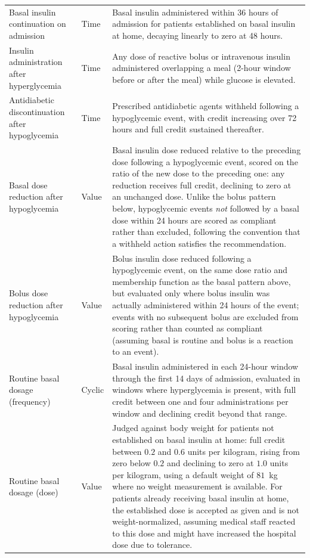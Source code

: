 \begin{table}[htbp]
\begin{tabularx}{\textwidth}{
>{\raggedright\arraybackslash}p{}
l
>{\raggedright\arraybackslash}X
}
Basal insulin continuation on admission & Time &
Basal insulin administered within 36 hours of admission for patients
established on basal insulin at home, decaying linearly to zero at 48
hours. \\

Insulin administration after hyperglycemia & Time &
Any dose of reactive bolus or intravenous insulin administered overlapping a
meal (2-hour window before or after the meal) while glucose is elevated. \\

Antidiabetic discontinuation after hypoglycemia & Time &
Prescribed antidiabetic agents withheld following a hypoglycemic event, with
credit increasing over 72 hours and full credit sustained thereafter. \\

Basal dose reduction after hypoglycemia & Value &
Basal insulin dose reduced relative to the preceding dose following a
hypoglycemic event, scored on the ratio of the new dose to the preceding one:
any reduction receives full credit, declining to zero at an unchanged dose.
Unlike the bolus pattern below, hypoglycemic events \emph{not} followed by a
basal dose within 24 hours are scored as compliant rather than excluded,
following the convention that a withheld action satisfies the
recommendation. \\

Bolus dose reduction after hypoglycemia & Value &
Bolus insulin dose reduced following a hypoglycemic event, on the same dose
ratio and membership function as the basal pattern above, but evaluated only
where bolus insulin was actually administered within 24 hours of the event;
events with no subsequent bolus are excluded from scoring rather than
counted as compliant (assuming basal is routine and bolus is a reaction to
an event). \\

Routine basal dosage (frequency) & Cyclic &
Basal insulin administered in each 24-hour window through the first 14 days
of admission, evaluated in windows where hyperglycemia is present, with full
credit between one and four administrations per window and declining credit
beyond that range. \\

Routine basal dosage (dose) & Value &
Judged against body weight for patients not established on basal insulin at
home: full credit between $0.2$ and $0.6$ units per kilogram, rising from
zero below $0.2$ and declining to zero at $1.0$ units per kilogram, using a
default weight of $81$~kg where no weight measurement is available. For
patients already receiving basal insulin at home, the established dose is
accepted as given and is not weight-normalized, assuming medical staff
reacted to this dose and might have increased the hospital dose due to
tolerance. \\

\bottomrule
\end{tabularx}
\end{table}

